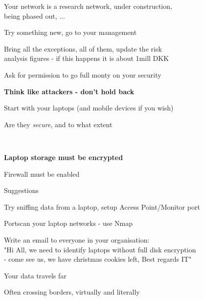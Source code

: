 \documentclass[Screen16to9,17pt,footrule]{foils}
\begin{document}
Your network is a research network, under construction, \\
being phased out, ...

Try something new, go to your management

Bring all the exceptions, all of them, update the risk \\
analysis figures - if this happens it is about 1mill DKK

Ask for permission to go full monty on your security

{\bf Think like attackers - don't hold back}



Start with your laptops (and mobile devices if you wish)

Are they \emph{secure}, and to what extent



{~}
\begin{list2}
\item {\bf Laptop storage must be encrypted}
\item Firewall must be enabled
\item Suggestions
\item Try sniffing data from a laptop, setup Access Point/Monitor port
\item Portscan your laptop networks - use Nmap
\item Write an email to everyone in your organisation:\\
"Hi All, we need to identify laptops without full disk encryption \\
- come see us, we have christmas cookies left, Best regards IT"
\end{list2}





\begin{list2}
\item Your data travels far
\item Often crossing borders, virtually and literally
\end{list2}
\end{document}

